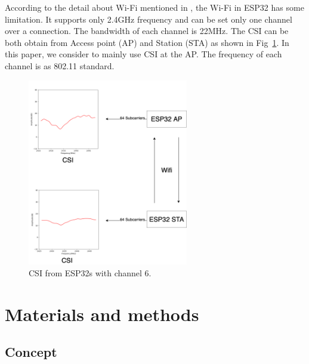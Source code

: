 \documentclass[10pt,letterpaper]{article}
\begin{document}
	According to the detail about Wi-Fi mentioned in , the Wi-Fi in ESP32 has some limitation. It supports only 2.4GHz frequency and can be set only one channel over a connection. The bandwidth of each channel is 22MHz. The CSI can be both obtain from Access point (AP) and Station (STA) as shown in Fig~\ref{fig:ESP32CSI01}.  In this paper, we consider to mainly use CSI at the AP.
	The frequency of each channel is as 802.11 standard.
	
	
	
	\begin{figure}[htbp]
		
		\centerline{\includegraphics[width=70mm,scale=0.5]{ESP32CSI01.png}}
		\caption{CSI from ESP32s with channel 6.}
		\label{fig:ESP32CSI01}
	\end{figure}
	

	
	\section*{Materials and methods}
	
	\subsection*{Concept}
	\label{concept}
	
\end{document}
